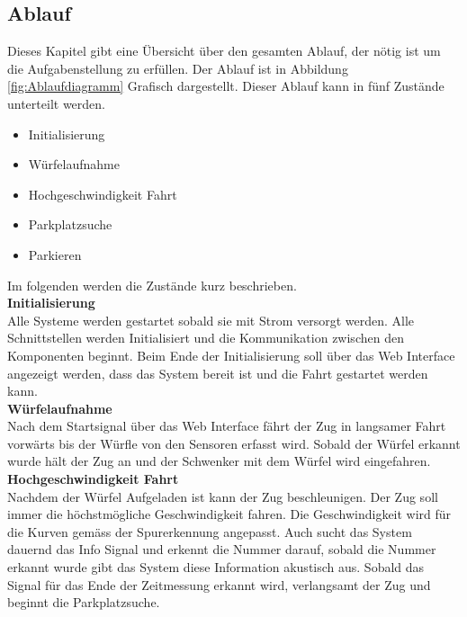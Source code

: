 \documentclass[../../main.tex]{subfiles}
\begin{document}
    \subsection{Ablauf} \label{ablauf}
    Dieses Kapitel gibt eine Übersicht über den gesamten Ablauf, der nötig ist um die Aufgabenstellung zu erfüllen. Der Ablauf ist in Abbildung \ref{fig:Ablaufdiagramm} Grafisch dargestellt. Dieser Ablauf kann in fünf Zustände unterteilt werden.

    \begin{itemize}
        \item Initialisierung
        \item Würfelaufnahme
        \item Hochgeschwindigkeit Fahrt
        \item Parkplatzsuche
        \item Parkieren
    \end{itemize}

    Im folgenden werden die Zustände kurz beschrieben.\\  

    \textbf{Initialisierung}\\
    Alle Systeme werden gestartet sobald sie mit Strom versorgt werden. Alle Schnittstellen werden Initialisiert und die Kommunikation zwischen den Komponenten beginnt. Beim Ende der Initialisierung soll über das Web Interface angezeigt werden, dass das System bereit ist und die Fahrt gestartet werden kann.\\

    \textbf{Würfelaufnahme}\\
    Nach dem Startsignal über das Web Interface fährt der Zug in langsamer Fahrt vorwärts bis der Würfle von den Sensoren erfasst wird. Sobald der Würfel erkannt wurde hält der Zug an und der Schwenker mit dem Würfel wird eingefahren.\\

    \textbf{Hochgeschwindigkeit Fahrt}\\
    Nachdem der Würfel Aufgeladen ist kann der Zug beschleunigen. Der Zug soll immer die höchstmögliche Geschwindigkeit fahren. Die Geschwindigkeit wird für die Kurven gemäss der Spurerkennung angepasst. Auch sucht das System dauernd das Info Signal und erkennt die Nummer darauf, sobald die Nummer erkannt wurde gibt das System diese Information akustisch aus.
    Sobald das Signal für das Ende der Zeitmessung erkannt wird, verlangsamt der Zug und beginnt die Parkplatzsuche.\\
\end{document}
